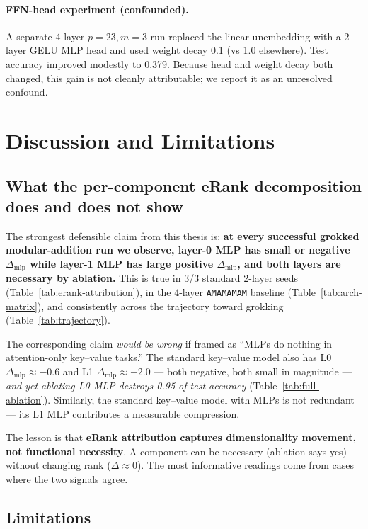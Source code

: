 \documentclass{article}
\begin{document}
\paragraph{FFN-head experiment (confounded).}
A separate 4-layer $p=23, m=3$ run replaced the linear unembedding with a 2-layer GELU MLP head and used weight decay 0.1 (vs 1.0 elsewhere). Test accuracy improved modestly to 0.379. Because head and weight decay both changed, this gain is not cleanly attributable; we report it as an unresolved confound.

\section{Discussion and Limitations}
\label{sec:discussion}

\subsection{What the per-component eRank decomposition does and does not show}

The strongest defensible claim from this thesis is: \textbf{at every successful grokked modular-addition run we observe, layer-0 MLP has small or negative $\Delta_{\text{mlp}}$ while layer-1 MLP has large positive $\Delta_{\text{mlp}}$, and both layers are necessary by ablation.} This is true in 3/3 standard 2-layer seeds (Table~\ref{tab:erank-attribution}), in the 4-layer \texttt{AMAMAMAM} baseline (Table~\ref{tab:arch-matrix}), and consistently across the trajectory toward grokking (Table~\ref{tab:trajectory}).

The corresponding claim \emph{would be wrong} if framed as ``MLPs do nothing in attention-only key--value tasks.'' The standard key--value model also has L0 $\Delta_{\text{mlp}}\approx -0.6$ and L1 $\Delta_{\text{mlp}}\approx -2.0$ --- both negative, both small in magnitude --- \emph{and yet ablating L0 MLP destroys 0.95 of test accuracy} (Table~\ref{tab:full-ablation}). Similarly, the standard key--value model with MLPs is not redundant --- its L1 MLP contributes a measurable compression.

The lesson is that \textbf{eRank attribution captures dimensionality movement, not functional necessity}. A component can be necessary (ablation says yes) without changing rank ($\Delta\approx 0$). The most informative readings come from cases where the two signals agree.

\subsection{Limitations}
\end{document}
